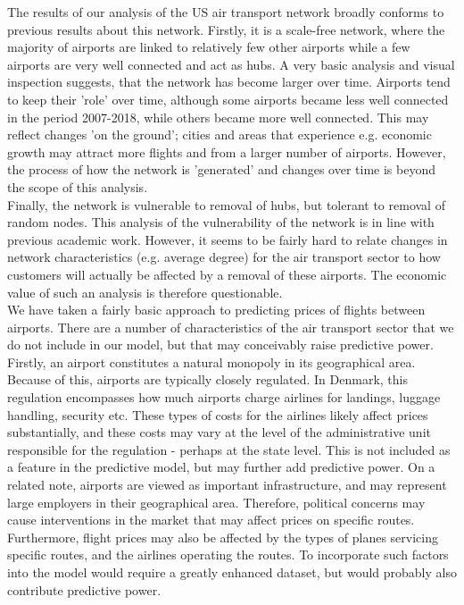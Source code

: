 \label{sec:results}
The results of our analysis of the US air transport network broadly conforms to previous results about this network. Firstly, it is a scale-free network, where the majority of airports are linked to relatively few other airports while a few airports are very well connected and act as hubs. A very basic analysis and visual inspection suggests, that the network has become larger over time. Airports tend to keep their 'role' over time, although some airports became less well connected in the period 2007-2018, while others became more well connected. This may reflect changes 'on the ground'; cities and areas that experience e.g. economic growth may attract more flights and from a larger number of airports. However, the process of how the network is 'generated' and changes over time is beyond the scope of this analysis. \\ Finally, the network is vulnerable to removal of hubs, but tolerant to removal of random nodes. This analysis of the vulnerability of the network is in line with previous academic work. However, it seems to be fairly hard to relate changes in network characteristics (e.g. average degree) for the air transport sector to how customers will actually be affected by a removal of these airports. The economic value of such an analysis is therefore questionable. \\

We have taken a fairly basic approach to predicting prices of flights between airports. There are a number of characteristics of the air transport sector that we do not include in our model, but that may conceivably raise predictive power. 
Firstly, an airport constitutes a natural monopoly in its geographical area. Because of this, airports are typically closely regulated. In Denmark, this regulation encompasses how much airports charge airlines for landings, luggage handling, security etc. These types of costs for the airlines likely affect prices substantially, and these costs may vary at the level of the administrative unit responsible for the regulation - perhaps at the state level. This is not included as a feature in the predictive model, but may further add predictive power. On a related note, airports are viewed as important infrastructure, and may represent large employers in their geographical area. Therefore, political concerns may cause interventions in the market that may affect prices on specific routes. Furthermore, flight prices may also be affected by the types of planes servicing specific routes, and the airlines operating the routes. To incorporate such factors into the model would require a greatly enhanced dataset, but would probably also contribute predictive power. \\
